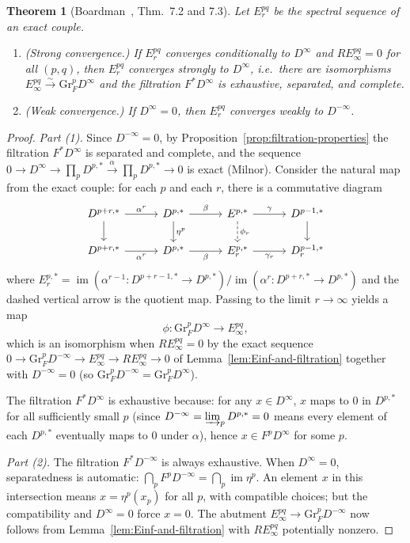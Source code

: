 \documentclass[12pt,a4paper]{article}
\newtheorem{theorem}{Theorem}[section]
\theoremstyle{definition}
\newcommand{\Gr}{\mathrm{Gr}}
\begin{document}
\begin{theorem}[Boardman~\cite{Boa99}, Thm.\ 7.2 and 7.3]\label{thm:convergence-criterion}
Let $E_r^{pq}$ be the spectral sequence of an exact couple.
\begin{enumerate}
  \item \textup{(Strong convergence.)}  If $E_r^{pq}$ converges conditionally to
    $D^\infty$ and $RE_\infty^{pq}=0$ for all $(p,q)$, then $E_r^{pq}$ converges
    strongly to $D^\infty$, i.e.\ there are isomorphisms
    $E_\infty^{pq}\xrightarrow{\sim}\Gr_F^p D^\infty$ and the filtration
    $F^*D^\infty$ is exhaustive, separated, and complete.
  \item \textup{(Weak convergence.)}  If $D^\infty=0$, then $E_r^{pq}$ converges
    weakly to $D^{-\infty}$.
\end{enumerate}
\end{theorem}
\begin{proof}
\textit{Part (1).}  Since $D^{-\infty}=0$, by Proposition~\ref{prop:filtration-properties}
the filtration $F^*D^\infty$ is separated and complete, and the sequence
$0\to D^\infty\to\prod_p D^{p,*}\xrightarrow{\alpha}\prod_p D^{p,*}\to 0$ is
exact (Milnor).  Consider the natural map from the exact couple:
for each $p$ and each $r$, there is a commutative diagram
\[
\begin{tikzcd}[column sep=3em]
  D^{p+r,*} \ar[r,"\alpha^r"] \ar[d] &
    D^{p,*} \ar[r,"\beta"] \ar[d,"\eta^p"] &
    E^{p,*} \ar[r,"\gamma"] \ar[d,dashed,"\phi_r"] &
    D^{p-1,*} \ar[d]\\
  D^{p+r,*} \ar[r,"\alpha^r"'] &
    D^{p,*} \ar[r,"\beta"'] &
    E_r^{p,*} \ar[r,"\gamma_r"'] &
    D_r^{p-1,*}
\end{tikzcd}
\]
where $E_r^{p,*}=\operatorname{im}(\alpha^{r-1}:D^{p+r-1,*}\to D^{p,*})/
\operatorname{im}(\alpha^r:D^{p+r,*}\to D^{p,*})$ and the dashed vertical arrow is
the quotient map.  Passing to the limit $r\to\infty$ yields a map
\[
  \phi: \Gr_F^p D^\infty
  \longrightarrow E_\infty^{pq},
\]
which is an isomorphism when $RE_\infty^{pq}=0$ by the exact sequence
$0\to\Gr_F^p D^{-\infty}\to E_\infty^{pq}\to RE_\infty^{pq}\to 0$
of Lemma~\ref{lem:Einf-and-filtration} together with $D^{-\infty}=0$ (so
$\Gr_F^p D^{-\infty}=\Gr_F^p D^\infty$).

The filtration $F^*D^\infty$ is exhaustive because: for any $x\in D^\infty$, $x$
maps to $0$ in $D^{p,*}$ for all sufficiently small $p$ (since $D^{-\infty}=
\varinjlim_p D^{p,*}=0$ means every element of each $D^{p,*}$ eventually maps to
$0$ under $\alpha$), hence $x\in F^pD^\infty$ for some $p$.

\textit{Part (2).}  The filtration $F^*D^{-\infty}$ is always exhaustive.  When
$D^\infty=0$, separatedness is automatic: $\bigcap_p F^pD^{-\infty}=
\bigcap_p\operatorname{im}\eta^p$.  An element $x$ in this intersection means
$x=\eta^p(x_p)$ for all $p$, with compatible choices; but the compatibility and
$D^\infty=0$ force $x=0$.  The abutment $E_\infty^{pq}\to\Gr_F^pD^{-\infty}$
now follows from Lemma~\ref{lem:Einf-and-filtration} with $RE_\infty^{pq}$
potentially nonzero.
\end{proof}
\end{document}
